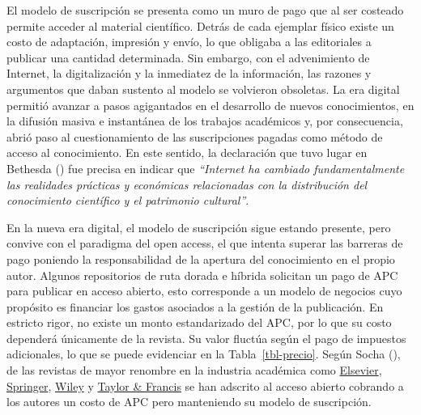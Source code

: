 \documentclass[
  spanish,
  a4paper,
  oneside]{scrbook}
\begin{document}
El modelo de suscripción se presenta como un muro de pago que al ser
costeado permite acceder al material científico. Detrás de cada ejemplar
físico existe un costo de adaptación, impresión y envío, lo que obligaba
a las editoriales a publicar una cantidad determinada. Sin embargo, con
el advenimiento de Internet, la digitalización y la inmediatez de la
información, las razones y argumentos que daban sustento al modelo se
volvieron obsoletas. La era digital permitió avanzar a pasos agigantados
en el desarrollo de nuevos conocimientos, en la difusión masiva e
instantánea de los trabajos académicos y, por consecuencia, abrió paso
al cuestionamiento de las suscripciones pagadas como método de acceso al
conocimiento. En este sentido, la declaración que tuvo lugar en Bethesda
() fue precisa en indicar
que \emph{``Internet ha cambiado fundamentalmente las realidades
prácticas y económicas relacionadas con la distribución del conocimiento
científico y el patrimonio cultural''}.

En la nueva era digital, el modelo de suscripción sigue estando
presente, pero convive con el paradigma del open access, el que intenta
superar las barreras de pago poniendo la responsabilidad de la apertura
del conocimiento en el propio autor. Algunos repositorios de ruta dorada
e híbrida solicitan un pago de APC para publicar en acceso abierto, esto
corresponde a un modelo de negocios cuyo propósito es financiar los
gastos asociados a la gestión de la publicación. En estricto rigor, no
existe un monto estandarizado del APC, por lo que su costo dependerá
únicamente de la revista. Su valor fluctúa según el pago de impuestos
adicionales, lo que se puede evidenciar en la Tabla~\ref{tbl-precio}.
Según Socha (), de las revistas de
mayor renombre en la industria académica como
\href{https://www.elsevier.com/open-science}{Elsevier},
\href{https://www.springer.com/la/open-access}{Springer},
\href{https://authorservices.wiley.com/author-resources/Journal-Authors/open-access/index.html}{Wiley}
y
\href{https://authorservices.taylorandfrancis.com/publishing-open-access/}{Taylor
\& Francis} se han adscrito al acceso abierto cobrando a los autores un
costo de APC pero manteniendo su modelo de suscripción.
\end{document}
